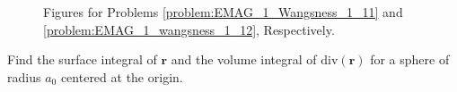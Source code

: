             \begin{figure}[H]
                \centering
                \captionsetup{type=figure}
                \begin{subfigure}[b]{0.49\textwidth}
                    \centering
                    \captionsetup{type=figure}
                    
                    \label{fig:EMAG_I_wangsness_1_11}
                \end{subfigure}
                \begin{subfigure}[b]{0.49\textwidth}
                    \centering
                    \captionsetup{type=figure}
                    
                    \label{fig:EMAG_1_geometry_for_wangsness_1_12}
                \end{subfigure}
                \caption[Figures for Wangsness 1-11 and 1-12]{%
                    Figures for Problems
                    \ref{problem:EMAG_1_Wangsness_1_11} and
                    \ref{problem:EMAG_1_wangsness_1_12}, Respectively.
                }
                \label{fig:EMAG_1_figures_for_wangsness_1_11_and_1_12}
            \end{figure}
            \begin{problem}[Wangsness 1-12]
                \label{problem:EMAG_1_wangsness_1_12}
                Find the surface integral of $\mathbf{r}$ and the
                volume integral of $\mathrm{div}(\mathbf{r})$
                for a sphere of radius $a_{0}$
                centered at the origin.
            \end{problem}
